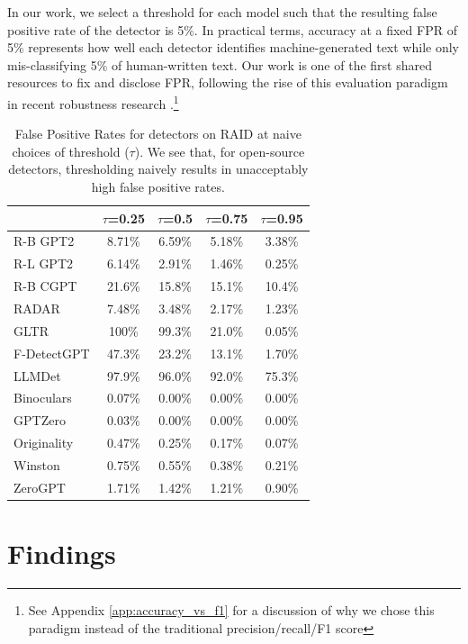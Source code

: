 \documentclass[11pt]{article}
\begin{document}
In our work, we select a threshold for each model such that the resulting false positive rate of the detector is 5\%. In practical terms, accuracy at a fixed FPR of 5\% represents how well each detector identifies machine-generated text while only mis-classifying 5\% of human-written text. %
Our work is one of the first shared resources to fix and disclose FPR, following the rise of this evaluation paradigm in recent robustness research \citep{hans2024spotting, krishna2023paraphrasing, soto2024fewshot}.\footnote{See Appendix \ref{app:accuracy_vs_f1} for a discussion of why we chose this paradigm instead of the traditional precision/recall/F1 score}

\begin{table}[t]
    \small
    \centering
    \begin{tabular}{l|c|c|c|c}
    \toprule
    &$\tau$=0.25&$\tau$=0.5&$\tau$=0.75&$\tau$=0.95\\
    \midrule
    R-B GPT2&8.71\%&6.59\%&5.18\%&3.38\%\\
    R-L GPT2&6.14\%&2.91\%&1.46\%&0.25\%\\
    R-B CGPT&21.6\%&15.8\%&15.1\%&10.4\%\\
    RADAR&7.48\%&3.48\%&2.17\%&1.23\%\\
    \midrule
    GLTR&100\%&99.3\%&21.0\%&0.05\%\\
    F-DetectGPT&47.3\%&23.2\%&13.1\%&1.70\%\\
    LLMDet&97.9\%&96.0\%&92.0\%&75.3\%\\
    Binoculars&0.07\%&0.00\%&0.00\%&0.00\%\\
    \midrule
    GPTZero&0.03\%&0.00\%&0.00\%&0.00\%\\
    Originality&0.47\%&0.25\%&0.17\%&0.07\%\\
    Winston&0.75\%&0.55\%&0.38\%&0.21\%\\
    ZeroGPT&1.71\%&1.42\%&1.21\%&0.90\%\\
    \bottomrule
    \end{tabular}
    \caption{False Positive Rates for detectors on RAID at naive choices of threshold ($\tau$). We see that, for open-source detectors, thresholding naively results in unacceptably high false positive rates.}
    \label{tab:fpr_results}
\end{table}

\section{Findings}
\end{document}

